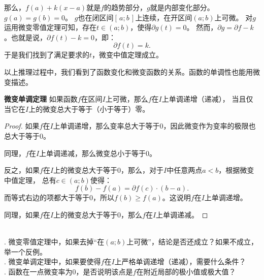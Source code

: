 \documentclass[12pt,UTF8]{ctexbook}
\begin{document}
那么，$f(a) + k(x - a)$就是$f$的趋势部分，$g$就是内部变化部分。$g(a) = g(b) = 0$。
$g$也在闭区间$[\,a; b\,]$上连续，在开区间$(a; b)$上可微。
对$g$运用微变零值定理可知，存在$t\in(a;b)$，使得$\partial g(t) = 0$。
然而，$\partial g = \partial f - k$。也就是说，$ \partial f(t) - k = 0$，即：
$$ \partial f(t) = k.$$
于是我们找到了满足要求的$t$，微变中值定理成立。

以上推理过程中，我们看到了函数变化和微变函数的关系。函数的单调性也能用微变描述。
\begin{tm}{\textbf{微变单调定理}}\label{tm:2-4-20}
    如果函数$f$在区间$I$上可微，那么$f$在$I$上单调递增（递减），
    当且仅当它在$I$上的微变总大于等于（小于等于）零。
\end{tm}

\begin{proof}
    如果$f$在$I$上单调递增，那么变率总大于等于$0$，因此微变作为变率的极限也总大于等于$0$。
    
    同理，$f$在$I$上单调递减，那么微变总小于等于$0$。

    反之，如果$f$在$I$上的微变总大于等于$0$，那么，对于$I$中任意两点$a < b$，根据微变中值定理，
    总有$c\in(a; b)$使得：
    $$f(b) - f(a) = \partial f(c) \cdot (b - a).$$
    而等式右边的项都大于等于$0$，所以$f(b) \geqslant f(a)$。这说明$f$在$I$上单调递增。
    
    同理，如果$f$在$I$上的微变总大于等于$0$，那么$f$在$I$上单调递减。
\end{proof}

\begin{sk}
    \mbox{} \\
    . 微变零值定理中，如果去掉“在$(a; b)$上可微”，结论是否还成立？如果不成立，举一个反例。\\
    . 微变单调定理中，如果要使得$f$在$I$上严格单调递增（递减），需要什么条件？\\
    . 函数在一点微变率为$0$，是否说明该点是$f$在附近局部的极小值或极大值？
\end{sk}
\end{document}
